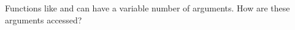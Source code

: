 
Functions like \printf and \scanf can have a variable number of arguments.
How are these arguments accessed?



